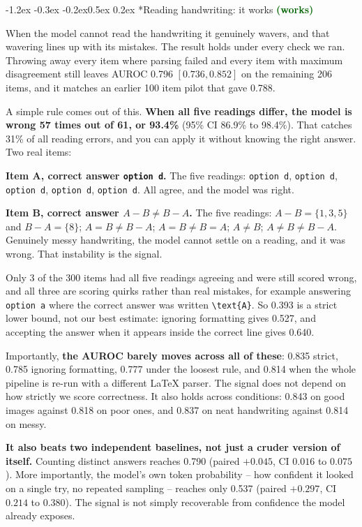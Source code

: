 \documentclass[10pt]{article}
\makeatletter
\newcommand{\worked}[1]{\textcolor{darkgreen}{\textbf{#1}}}
\renewcommand\subsection{\@startsection{subsection}{2}{\z@}%
  {-1.2ex \@plus -0.3ex \@minus -0.2ex}{0.5ex \@plus 0.2ex}%
  {\normalfont\normalsize\bfseries}}
\makeatother
\begin{document}
\subsection*{Reading handwriting: it works \worked{(works)}}

When the model cannot read the handwriting it genuinely wavers, and that
wavering lines up with its mistakes. The result holds under every check we ran.
Throwing away every item where parsing failed and every item with maximum
disagreement still leaves AUROC 0.796 $[0.736, 0.852]$ on the remaining 206
items, and it matches an earlier 100 item pilot that gave 0.788.

A simple rule comes out of this. \textbf{When all five readings differ, the model
is wrong 57 times out of 61, or 93.4\%} (95\% CI 86.9\% to 98.4\%). That catches
31\% of all reading errors, and you can apply it without knowing the right
answer. Two real items:

\smallskip
\noindent\footnotesize\textbf{Item A, correct answer \texttt{option d}.} The five
readings: \texttt{option d}, \texttt{option d}, \texttt{option d},
\texttt{option d}, \texttt{option d}. All agree, and the model was right.

\noindent\textbf{Item B, correct answer $A - B \neq B - A$.} The five readings:
$A - B = \{1,3,5\}$ and $B - A = \{8\}$; $A = B \neq B - A$; $A = B \neq B = A$;
$A \neq B$; $A \neq B \neq B - A$. Genuinely messy handwriting, the model cannot
settle on a reading, and it was wrong. That instability is the signal.
\normalsize\smallskip

Only 3 of the 300 items had all five readings agreeing and were still scored
wrong, and all three are scoring quirks rather than real mistakes, for example
answering \texttt{option a} where the correct answer was written
\texttt{\textbackslash text\{A\}}. So 0.393 is a strict lower bound, not our
best estimate: ignoring formatting gives 0.527, and accepting the answer when it
appears inside the correct line gives 0.640.

Importantly, \textbf{the AUROC barely moves across all of these}: 0.835 strict,
0.785 ignoring formatting, 0.777 under the loosest rule, and 0.814 when the
whole pipeline is re-run with a different \LaTeX{} parser. The signal does not
depend on how strictly we score correctness. It also holds across conditions:
0.843 on good images against 0.818 on poor ones, and 0.837 on neat handwriting
against 0.814 on messy.

\textbf{It also beats two independent baselines, not just a cruder version of
itself.} Counting distinct answers reaches 0.790 (paired $+0.045$, CI $0.016$
to $0.075$). More importantly, the model's own token probability -- how
confident it looked on a single try, no repeated sampling -- reaches only
0.537 (paired $+0.297$, CI $0.214$ to $0.380$). The signal is not simply
recoverable from confidence the model already exposes.
\end{document}

